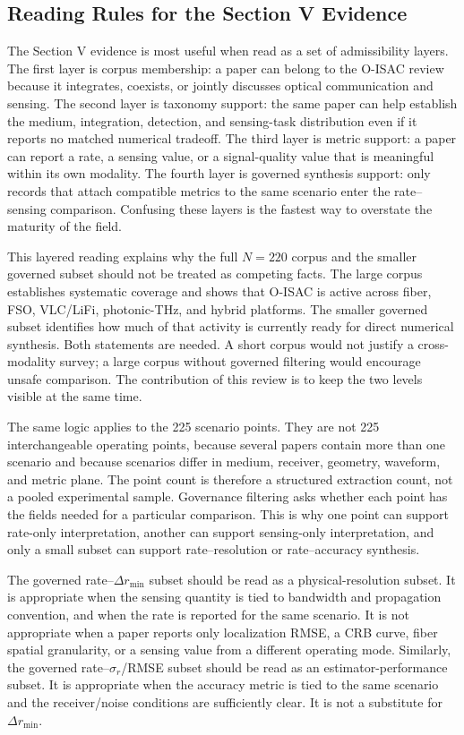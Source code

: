 \documentclass[letterpaper,journal]{IEEEtran}
\begin{document}
\subsection{Reading Rules for the Section V Evidence}

The Section V evidence is most useful when read as a set of admissibility layers. The first layer is corpus membership: a paper can belong to the O-ISAC review because it integrates, coexists, or jointly discusses optical communication and sensing. The second layer is taxonomy support: the same paper can help establish the medium, integration, detection, and sensing-task distribution even if it reports no matched numerical tradeoff. The third layer is metric support: a paper can report a rate, a sensing value, or a signal-quality value that is meaningful within its own modality. The fourth layer is governed synthesis support: only records that attach compatible metrics to the same scenario enter the rate--sensing comparison. Confusing these layers is the fastest way to overstate the maturity of the field.

This layered reading explains why the full \(N=220\) corpus and the smaller governed subset should not be treated as competing facts. The large corpus establishes systematic coverage and shows that O-ISAC is active across fiber, FSO, VLC/LiFi, photonic-THz, and hybrid platforms. The smaller governed subset identifies how much of that activity is currently ready for direct numerical synthesis. Both statements are needed. A short corpus would not justify a cross-modality survey; a large corpus without governed filtering would encourage unsafe comparison. The contribution of this review is to keep the two levels visible at the same time.

The same logic applies to the 225 scenario points. They are not 225 interchangeable operating points, because several papers contain more than one scenario and because scenarios differ in medium, receiver, geometry, waveform, and metric plane. The point count is therefore a structured extraction count, not a pooled experimental sample. Governance filtering asks whether each point has the fields needed for a particular comparison. This is why one point can support rate-only interpretation, another can support sensing-only interpretation, and only a small subset can support rate--resolution or rate--accuracy synthesis.

The governed rate--$\Delta r_{\min}$ subset should be read as a physical-resolution subset. It is appropriate when the sensing quantity is tied to bandwidth and propagation convention, and when the rate is reported for the same scenario. It is not appropriate when a paper reports only localization RMSE, a CRB curve, fiber spatial granularity, or a sensing value from a different operating mode. Similarly, the governed rate--$\sigma_r$/RMSE subset should be read as an estimator-performance subset. It is appropriate when the accuracy metric is tied to the same scenario and the receiver/noise conditions are sufficiently clear. It is not a substitute for $\Delta r_{\min}$.
\end{document}
